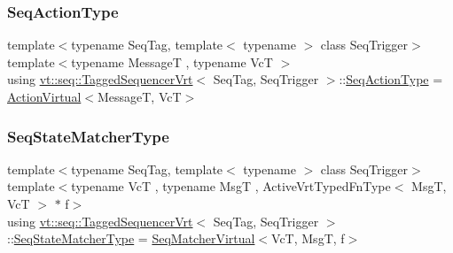 \mbox{\label{structvt_1_1seq_1_1_tagged_sequencer_vrt_af7a8c4c1f5e352fb6d817b51fbf098d6}} 
\subsubsection{\texorpdfstring{Seq\+Action\+Type}{SeqActionType}}
{\footnotesize\ttfamily template$<$typename Seq\+Tag, template$<$ typename $>$ class Seq\+Trigger$>$ \\
template$<$typename MessageT , typename VcT $>$ \\
using \hyperlink{structvt_1_1seq_1_1_tagged_sequencer_vrt}{vt\+::seq\+::\+Tagged\+Sequencer\+Vrt}$<$ Seq\+Tag, Seq\+Trigger $>$\+::\hyperlink{structvt_1_1seq_1_1_tagged_sequencer_a0210dbd34288d440e0cd51db9d6637bd}{Seq\+Action\+Type} =  \hyperlink{structvt_1_1seq_1_1_action_virtual}{Action\+Virtual}$<$MessageT, VcT$>$}

\mbox{\label{structvt_1_1seq_1_1_tagged_sequencer_vrt_a631ea1df2eb19c0058aaf29f93950226}} 
\subsubsection{\texorpdfstring{Seq\+State\+Matcher\+Type}{SeqStateMatcherType}}
{\footnotesize\ttfamily template$<$typename Seq\+Tag, template$<$ typename $>$ class Seq\+Trigger$>$ \\
template$<$typename VcT , typename MsgT , Active\+Vrt\+Typed\+Fn\+Type$<$ Msg\+T, Vc\+T $>$ $\ast$ f$>$ \\
using \hyperlink{structvt_1_1seq_1_1_tagged_sequencer_vrt}{vt\+::seq\+::\+Tagged\+Sequencer\+Vrt}$<$ Seq\+Tag, Seq\+Trigger $>$\+::\hyperlink{structvt_1_1seq_1_1_tagged_sequencer_a8b215c5e7be7295118d6d0716f3a8052}{Seq\+State\+Matcher\+Type} =  \hyperlink{structvt_1_1seq_1_1_seq_matcher_virtual}{Seq\+Matcher\+Virtual}$<$VcT, MsgT, f$>$}

